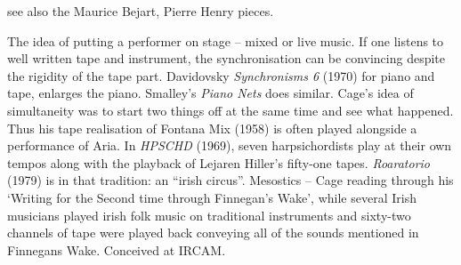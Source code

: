 see also the Maurice Bejart, Pierre Henry pieces.

The idea of putting a performer on stage – mixed or live music.  If one listens to well written tape and instrument, the synchronisation can be convincing despite the rigidity of the tape part.  Davidovsky \textit{Synchronisms 6} (1970) for piano and tape, enlarges the piano. Smalley's \textit{Piano Nets} does similar.  Cage's idea of simultaneity was to start two things off at the same time and see what happened. Thus his tape realisation of Fontana Mix (1958) is often played alongside a performance of Aria. In \textit{HPSCHD} (1969), seven harpsichordists play at their own tempos along with the playback of Lejaren Hiller's fifty-one tapes.  \textit{Roaratorio} (1979) is in that tradition: an ``irish circus''. Mesostics – Cage reading through his `Writing for the Second time through Finnegan's Wake', while several Irish musicians played irish folk music on traditional instruments and sixty-two channels of tape were played back conveying all of the sounds mentioned in Finnegans Wake. Conceived at IRCAM. 


